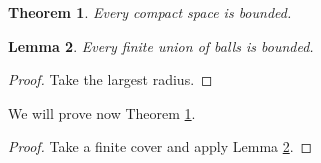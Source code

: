 \documentclass{article}
\newtheorem{theorem}{Theorem}
\newtheorem{lemma}[theorem]{Lemma}
\begin{document}
\begin{theorem}\label{main} Every compact space is bounded. \end{theorem}
\begin{lemma}\label{aux} Every finite union of balls is bounded. \end{lemma}
\begin{proof} Take the largest radius. \end{proof}

We will prove now Theorem \ref{main}.

\begin{proof} Take a finite cover and apply Lemma \ref{aux}. \end{proof}
\end{document}
